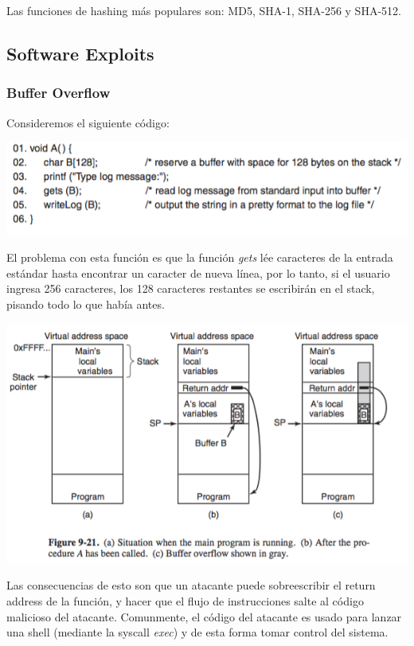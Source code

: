 Las funciones de hashing más populares son: MD5, SHA-1, SHA-256 y SHA-512.


\subsection{Software Exploits}

\subsubsection{Buffer Overflow}

Consideremos el siguiente código:

\includegraphics[scale=0.5]{imagenes/buffer-overflow}


El problema con esta función es que la función \textit{gets} lée caracteres de la entrada estándar hasta encontrar un caracter de nueva línea, por lo tanto, si el usuario ingresa 256 caracteres, los 128 caracteres restantes se escribirán en el stack, pisando todo lo que había antes.

\includegraphics[scale=0.6]{imagenes/buffer-overflow2}

Las consecuencias de esto son que un atacante puede sobreescribir el return address de la función, y hacer que el flujo de instrucciones salte al código malicioso del atacante. Comunmente, el código del atacante es usado para lanzar una shell (mediante la syscall \textit{exec}) y de esta forma tomar control del sistema.

